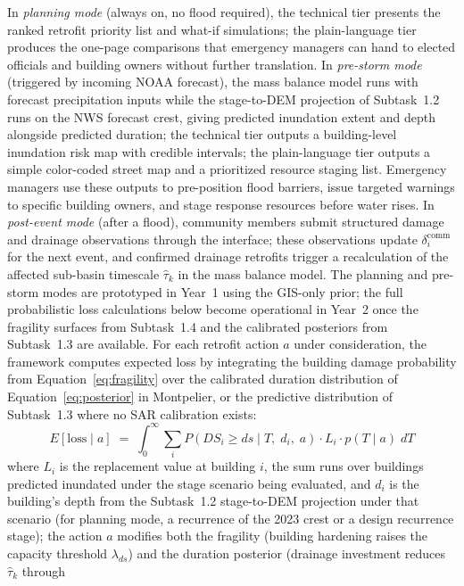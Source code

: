 \documentclass[11pt]{article}
\begin{document}
In \textit{planning mode} (always on, no flood required), the technical tier presents
the ranked retrofit priority list and what-if simulations; the plain-language tier
produces the one-page comparisons that emergency managers can hand to elected
officials and building owners without further translation.
In \textit{pre-storm mode} (triggered by incoming NOAA forecast), the mass balance
model runs with forecast precipitation inputs while the stage-to-DEM projection of
Subtask~1.2 runs on the NWS forecast crest, giving predicted inundation extent and
depth alongside predicted duration; the technical tier outputs a
building-level inundation risk map with credible intervals; the plain-language tier
outputs a simple color-coded street map and a prioritized resource staging list.
Emergency managers use these outputs to pre-position flood barriers, issue targeted
warnings to specific building owners, and stage response resources before water rises.
In \textit{post-event mode} (after a flood), community members submit structured
damage and drainage observations through the interface; these observations update
$\delta_i^{\mathrm{comm}}$ for the next event, and confirmed drainage retrofits
trigger a recalculation of the affected sub-basin timescale $\hat{\tau}_k$ in the
mass balance model.
The planning and pre-storm modes are prototyped in Year~1 using the GIS-only
prior; the full probabilistic loss calculations below become operational in
Year~2 once the fragility surfaces from Subtask~1.4 and the calibrated posteriors
from Subtask~1.3 are available.
For each retrofit action $a$ under consideration, the framework computes expected
loss by integrating the building damage probability from Equation~\eqref{eq:fragility} over the
calibrated duration distribution of Equation~\eqref{eq:posterior} in Montpelier, or the
predictive distribution of Subtask~1.3 where no SAR calibration exists:
\begin{equation}\label{eq:loss}
  E[\text{loss} \mid a] \;=\;
  \int_0^\infty \sum_{i}
    P(DS_i \geq ds \mid T,\; d_i,\; a)\cdot L_i
    \cdot p(T \mid a)\; dT
\end{equation}
where $L_i$ is the replacement value at building $i$, the sum runs over buildings
predicted inundated under the stage scenario being evaluated, and $d_i$ is the
building's depth from the Subtask~1.2 stage-to-DEM projection under that scenario
(for planning mode, a recurrence of the 2023 crest or a design recurrence stage);
the action $a$ modifies both
the fragility (building hardening raises the capacity threshold $\lambda_{ds}$)
and the duration posterior (drainage investment reduces $\hat{\tau}_k$ through
\end{document}
